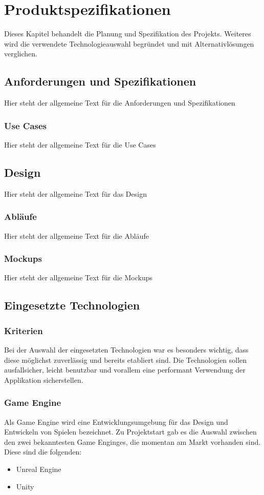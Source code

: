 \chapter{Produktspezifikationen}
Dieses Kapitel behandelt die Planung und Spezifikation des Projekts.
Weiteres wird die verwendete Technologieauswahl begründet und mit Alternativlösungen verglichen.

\section{Anforderungen und Spezifikationen}
Hier steht der allgemeine Text für die Anforderungen und Spezifikationen

\subsection{Use Cases}
Hier steht der allgemeine Text für die Use Cases

\section{Design}
Hier steht der allgemeine Text für das Design

\subsection{Abläufe}
Hier steht der allgemeine Text für die Abläufe

\subsection{Mockups}
Hier steht der allgemeine Text für die Mockups

\section{Eingesetzte Technologien}

\subsection{Kriterien}
Bei der Auswahl der eingesetzten Technologien war es besonders wichtig, dass diese möglichst
zuverlässig und bereits etabliert sind. Die Technologien sollen ausfallsicher, leicht benutzbar
und vorallem eine performant Verwendung der Applikation sicherstellen.

\subsection{Game Engine}
Als Game Engine wird eine Entwicklungsumgebung für das Design und Entwickeln von Spielen bezeichnet.
Zu Projektstart gab es die Auswahl zwischen den zwei bekanntesten Game Enginges, die momentan am Markt
vorhanden sind. Diese sind die folgenden:
\begin{itemize}
    \item Unreal Engine
    \item Unity
\end{itemize}

